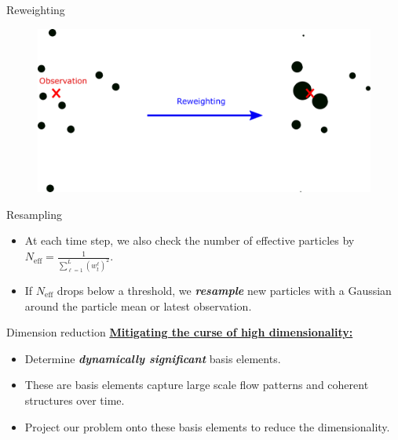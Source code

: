 \documentclass[aspectratio=169]{beamer}
\newcommand\boldgreen[1]{\textcolor{lighter_csu_green}{\emph{\textbf{#1}}}}
\begin{document}

\begin{frame}{Reweighting}
\vfill
\begin{figure}[H]
    \centering
    \includegraphics[width=.85\textwidth]{figures/reweighting.png}
\end{figure}
\vspace*{.25cm}
\end{frame}


\begin{frame}{Resampling}
\vfill
\begin{itemize}
    \pause
    \item At each time step, we also check the number of effective particles by $N_{\textrm{eff}} = \frac{1}{\sum_{\ell =1}^L (w_t^\ell)^2}$.
    \pause
    \item If $N_{\textrm{eff}}$ drops below a threshold, we \boldgreen{resample} new particles with a Gaussian around the particle mean or latest observation.
\end{itemize}
\vfill
\end{frame}



\begin{frame}{Dimension reduction}
\vfill
    \pause
    \textbf{\underline{Mitigating the curse of high dimensionality:}}
    \pause
    \begin{itemize}
        \item Determine \boldgreen{dynamically significant} basis elements. 
    \pause
        \item These are basis elements capture large scale flow patterns and coherent structures over time.
    \pause
        \item Project our problem onto these basis elements to reduce the dimensionality.
    \end{itemize}
\vfill
\end{frame}
\end{document}

